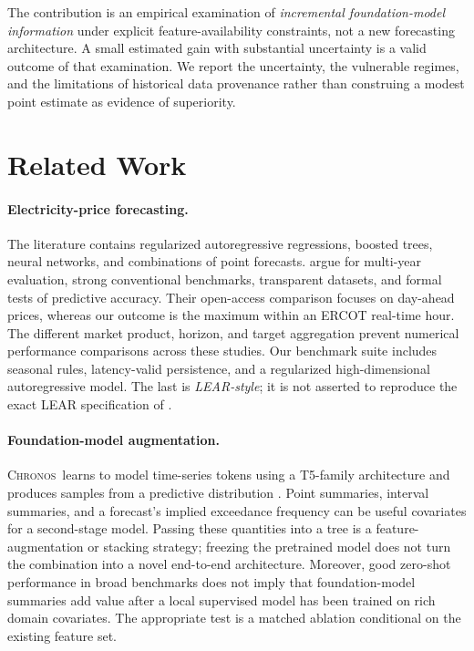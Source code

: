 \documentclass[11pt,letterpaper]{article}
\newcommand{\Chronos}{\textsc{Chronos}}
\begin{document}
The contribution is an empirical examination of \emph{incremental foundation-model information} under explicit feature-availability constraints, not a new forecasting architecture. A small estimated gain with substantial uncertainty is a valid outcome of that examination. We report the uncertainty, the vulnerable regimes, and the limitations of historical data provenance rather than construing a modest point estimate as evidence of superiority.

\section{Related Work}\label{sec:related}
\paragraph{Electricity-price forecasting.} The literature contains regularized autoregressive regressions, boosted trees, neural networks, and combinations of point forecasts. \citet{lago2021review} argue for multi-year evaluation, strong conventional benchmarks, transparent datasets, and formal tests of predictive accuracy. Their open-access comparison focuses on day-ahead prices, whereas our outcome is the maximum within an ERCOT real-time hour. The different market product, horizon, and target aggregation prevent numerical performance comparisons across these studies. Our benchmark suite includes seasonal rules, latency-valid persistence, and a regularized high-dimensional autoregressive model. The last is \emph{LEAR-style}; it is not asserted to reproduce the exact LEAR specification of \citet{lago2021review}.

\paragraph{Foundation-model augmentation.} \Chronos\ learns to model time-series tokens using a T5-family architecture and produces samples from a predictive distribution \citep{ansari2024chronos}. Point summaries, interval summaries, and a forecast's implied exceedance frequency can be useful covariates for a second-stage model. Passing these quantities into a tree is a feature-augmentation or stacking strategy; freezing the pretrained model does not turn the combination into a novel end-to-end architecture. Moreover, good zero-shot performance in broad benchmarks does not imply that foundation-model summaries add value after a local supervised model has been trained on rich domain covariates. The appropriate test is a matched ablation conditional on the existing feature set.
\end{document}
